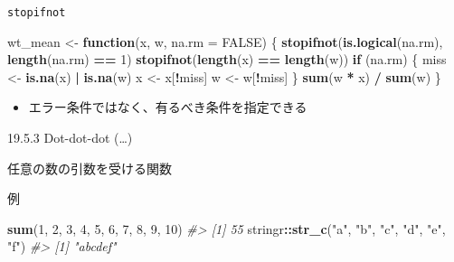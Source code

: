 \documentclass[ignorenonframetext,]{beamer}
\newenvironment{Shaded}{\begin{snugshade}}{\end{snugshade}}
\newcommand{\KeywordTok}[1]{\textcolor[rgb]{0.13,0.29,0.53}{\textbf{#1}}}
\newcommand{\DataTypeTok}[1]{\textcolor[rgb]{0.13,0.29,0.53}{#1}}
\newcommand{\DecValTok}[1]{\textcolor[rgb]{0.00,0.00,0.81}{#1}}
\newcommand{\StringTok}[1]{\textcolor[rgb]{0.31,0.60,0.02}{#1}}
\newcommand{\CommentTok}[1]{\textcolor[rgb]{0.56,0.35,0.01}{\textit{#1}}}
\newcommand{\OtherTok}[1]{\textcolor[rgb]{0.56,0.35,0.01}{#1}}
\newcommand{\ControlFlowTok}[1]{\textcolor[rgb]{0.13,0.29,0.53}{\textbf{#1}}}
\newcommand{\OperatorTok}[1]{\textcolor[rgb]{0.81,0.36,0.00}{\textbf{#1}}}
\newcommand{\NormalTok}[1]{#1}
\providecommand{\tightlist}{%
  \setlength{\itemsep}{0pt}\setlength{\parskip}{0pt}}
\begin{document}
\begin{frame}[fragile]{\texttt{stopifnot}}

\begin{Shaded}
\begin{Highlighting}[]
\NormalTok{wt_mean <-}\StringTok{ }\ControlFlowTok{function}\NormalTok{(x, w, }\DataTypeTok{na.rm =} \OtherTok{FALSE}\NormalTok{) \{}
  \KeywordTok{stopifnot}\NormalTok{(}\KeywordTok{is.logical}\NormalTok{(na.rm), }\KeywordTok{length}\NormalTok{(na.rm) }\OperatorTok{==}\StringTok{ }\DecValTok{1}\NormalTok{)}
  \KeywordTok{stopifnot}\NormalTok{(}\KeywordTok{length}\NormalTok{(x) }\OperatorTok{==}\StringTok{ }\KeywordTok{length}\NormalTok{(w)) }
  \ControlFlowTok{if}\NormalTok{ (na.rm) \{}
\NormalTok{    miss <-}\StringTok{ }\KeywordTok{is.na}\NormalTok{(x) }\OperatorTok{|}\StringTok{ }\KeywordTok{is.na}\NormalTok{(w)}
\NormalTok{    x <-}\StringTok{ }\NormalTok{x[}\OperatorTok{!}\NormalTok{miss]}
\NormalTok{    w <-}\StringTok{ }\NormalTok{w[}\OperatorTok{!}\NormalTok{miss]}
\NormalTok{  \}}
  \KeywordTok{sum}\NormalTok{(w }\OperatorTok{*}\StringTok{ }\NormalTok{x) }\OperatorTok{/}\StringTok{ }\KeywordTok{sum}\NormalTok{(w)}
\NormalTok{\}}
\end{Highlighting}
\end{Shaded}

\begin{itemize}
\tightlist
\item
  エラー条件ではなく、有るべき条件を指定できる
\end{itemize}

\end{frame}

\begin{frame}[fragile]{19.5.3 Dot-dot-dot (\ldots{})}

任意の数の引数を受ける関数

\begin{block}{例}

\begin{Shaded}
\begin{Highlighting}[]
\KeywordTok{sum}\NormalTok{(}\DecValTok{1}\NormalTok{, }\DecValTok{2}\NormalTok{, }\DecValTok{3}\NormalTok{, }\DecValTok{4}\NormalTok{, }\DecValTok{5}\NormalTok{, }\DecValTok{6}\NormalTok{, }\DecValTok{7}\NormalTok{, }\DecValTok{8}\NormalTok{, }\DecValTok{9}\NormalTok{, }\DecValTok{10}\NormalTok{)}
\CommentTok{#> [1] 55}
\NormalTok{stringr}\OperatorTok{::}\KeywordTok{str_c}\NormalTok{(}\StringTok{"a"}\NormalTok{, }\StringTok{"b"}\NormalTok{, }\StringTok{"c"}\NormalTok{, }\StringTok{"d"}\NormalTok{, }\StringTok{"e"}\NormalTok{, }\StringTok{"f"}\NormalTok{)}
\CommentTok{#> [1] "abcdef"}
\end{Highlighting}
\end{Shaded}

\end{block}

\end{frame}
\end{document}
